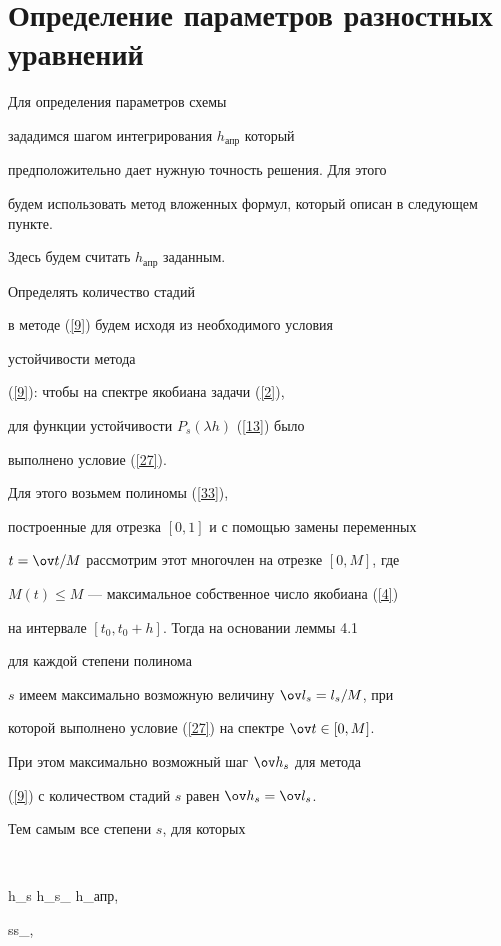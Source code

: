 \section{Определение параметров разностных уравнений}





Для определения параметров схемы


зададимся шагом интегрирования $h_{апр}$ который


предположительно дает нужную точность решения. Для этого


будем использовать метод вложенных формул, который описан в следующем пункте.


Здесь будем считать $h_{апр}$ заданным.





Определять количество стадий


в методе (\ref{9}) будем исходя из необходимого условия


устойчивости метода


(\ref{9}): чтобы на спектре якобиана задачи (\ref{2}),


для функции устойчивости $P_s(\lambda h)$ (\ref{13}) было


выполнено условие (\ref{27}).


Для этого возьмем полиномы (\ref{33}),


построенные для отрезка $[0,1]$ и с помощью замены переменных


$t=\ov t/M$ рассмотрим этот многочлен на отрезке $[0,M]$, где


$M(t)\le M$ --- максимальное собственное число якобиана (\ref{4})


на интервале $[t_0,t_0+h]$. Тогда на основании леммы 4.1


для каждой степени полинома


$s$ имеем максимально возможную величину $\ov l_s=l_s/M$, при


которой выполнено условие (\ref{27}) на спектре $\ov t \in [0,M]$.


При этом максимально возможный шаг $\ov h_s$ для метода


(\ref{9}) с количеством стадий $s$ равен $\ov h_s=\ov l_s$.


Тем самым все степени $s$, для которых


$$


\ov h_s \le \ov h_{s_{\max}} \le h_{апр},


\quad s\le s_{\max},



